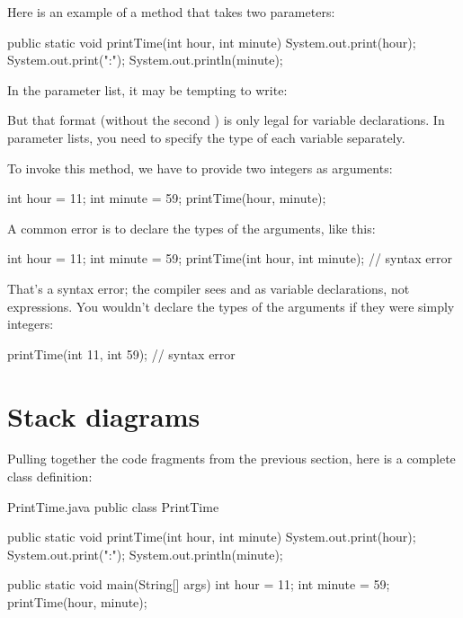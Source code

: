 
Here is an example of a method that takes two parameters:

\begin{code}
public static void printTime(int hour, int minute) {
    System.out.print(hour);
    System.out.print(":");
    System.out.println(minute);
}
\end{code}

In the parameter list, it may be tempting to write:

\begin{code}
public static void printTime(int hour, minute) {
    ...
\end{code}

But that format (without the second ) is only legal for variable declarations.
In parameter lists, you need to specify the type of each variable separately.

To invoke this method, we have to provide two integers as arguments:

\begin{code}
int hour = 11;
int minute = 59;
printTime(hour, minute);
\end{code}

A common error is to declare the types of the arguments, like this:

\begin{code}
int hour = 11;
int minute = 59;
printTime(int hour, int minute);  // syntax error
\end{code}

That's a syntax error; the compiler sees  and  as variable declarations, not expressions.
You wouldn't declare the types of the arguments if they were simply integers:

\begin{code}
printTime(int 11, int 59);  // syntax error
\end{code}


\section{Stack diagrams}
\label{stack}

Pulling together the code fragments from the previous section, here is a complete class definition:

\begin{trinket}[340]{PrintTime.java}
public class PrintTime {

    public static void printTime(int hour, int minute) {
        System.out.print(hour);
        System.out.print(":");
        System.out.println(minute);
    }

    public static void main(String[] args) {
        int hour = 11;
        int minute = 59;
        printTime(hour, minute);
    }
}
\end{trinket}

